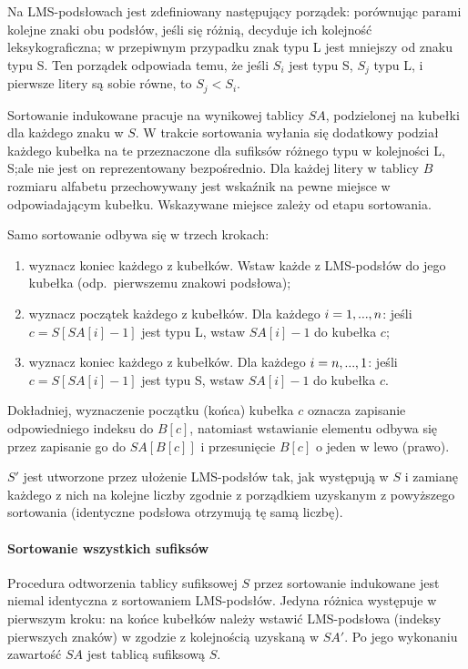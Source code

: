 Na LMS-podsłowach jest zdefiniowany następujący porządek: porównując parami
kolejne znaki obu podsłów, jeśli się różnią, decyduje ich kolejność
leksykograficzna; w przepiwnym przypadku znak typu L jest mniejszy od znaku
typu S. Ten porządek odpowiada temu, że jeśli $S_i$ jest typu S, $S_j$ typu L,
i pierwsze litery są sobie równe, to $S_j < S_i$.

Sortowanie indukowane pracuje na wynikowej tablicy $SA$, podzielonej
na kubełki dla każdego znaku w $S$. W trakcie sortowania wyłania się dodatkowy
podział każdego kubełka na te przeznaczone dla sufiksów różnego typu w
kolejności L, S;\@ ale nie jest on reprezentowany bezpośrednio. Dla każdej
litery w tablicy $B$ rozmiaru alfabetu przechowywany jest wskaźnik na pewne
miejsce w odpowiadającym kubełku. Wskazywane miejsce zależy od etapu
sortowania.

Samo sortowanie odbywa się w trzech krokach:

\begin{enumerate}
	\item wyznacz koniec każdego z kubełków. Wstaw każde z LMS-podsłów do jego
		kubełka (odp.\ pierwszemu znakowi podsłowa);
	\item wyznacz początek każdego z kubełków. Dla każdego $i = 1, \elps, n$:
		jeśli $c = S[SA[i] - 1]$ jest typu L, wstaw $SA[i] - 1$ do kubełka $c$;
	\item wyznacz koniec każdego z kubełków. Dla każdego $i = n, \elps, 1$:
		jeśli $c = S[SA[i] - 1]$ jest typu S, wstaw $SA[i] - 1$ do kubełka $c$.
\end{enumerate}

Dokładniej, wyznaczenie początku (końca) kubełka $c$ oznacza zapisanie
odpowiedniego indeksu do $B[c]$, natomiast wstawianie elementu odbywa się przez
zapisanie go do $SA[B[c]]$ i przesunięcie $B[c]$ o jeden w lewo (prawo).

$S'$ jest utworzone przez ułożenie LMS-podsłów tak, jak występują w $S$ i
zamianę każdego z nich na kolejne liczby zgodnie z porządkiem uzyskanym z
powyższego sortowania (identyczne podsłowa otrzymują tę samą liczbę).

\paragraph{Sortowanie wszystkich sufiksów}

Procedura odtworzenia tablicy sufiksowej $S$ przez sortowanie indukowane jest
niemal identyczna z sortowaniem LMS-podsłów.  Jedyna różnica występuje w
pierwszym kroku: na końce kubełków należy wstawić LMS-podsłowa (indeksy
pierwszych znaków) w zgodzie z kolejnością uzyskaną w $SA'$. Po jego wykonaniu
zawartość $SA$ jest tablicą sufiksową $S$.

